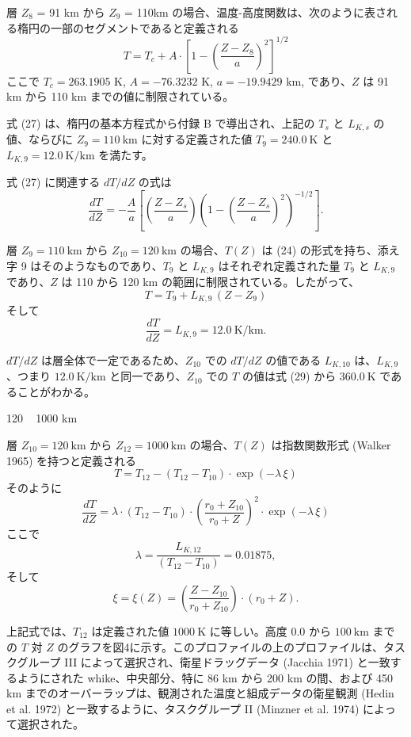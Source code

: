 \documentclass{article}
\begin{document}
層 $Z_8$ = 91 km から $Z_9$ = 110km の場合、温度-高度関数は、次のように表される楕円の一部のセグメントであると定義される
\begin{equation}
  T = T_c + A \cdot \left[ 1 - \left( \frac{Z - Z_8}{a} \right)^2 \right]^{1/2}
  \tag{27}
\end{equation}
ここで
$T_c = 263.1905$ K, $A = -76.3232$ K, $a = -19.9429$ km, であり、$Z$ は 91 km から 110 km までの値に制限されている。

式 (27) は、楕円の基本方程式から付録 B で導出され、上記の $T_s$ と $L_{K,s}$ の値、ならびに $Z_9 = 110~\text{km}$ に対する定義された値 $T_9 = 240.0~\text{K}$ と $L_{K,9} = 12.0~\text{K/km}$ を満たす。

式 (27) に関連する $dT/dZ$ の式は
\[
\frac{dT}{dZ} = -\frac{A}{a} \left[ \left(\frac{Z - Z_s}{a} \right) \left(1 - \left(\frac{Z - Z_s}{a} \right)^2 \right)^{-1/2} \right]. \tag{28}
\]

層 $Z_9 = 110~\text{km}$ から $Z_{10} = 120~\text{km}$ の場合、$T(Z)$ は (24) の形式を持ち、添え字 9 はそのようなものであり、$T_9$ と $L_{K,9}$ はそれぞれ定義された量 $T_9$ と $L_{K,9}$ であり、$Z$ は 110 から 120 km の範囲に制限されている。したがって、
\[
T = T_9 + L_{K,9} \, (Z - Z_9) \tag{29}
\]
そして
\[
\frac{dT}{dZ} = L_{K,9} = 12.0~\text{K/km}. \tag{30}
\]

$dT/dZ$ は層全体で一定であるため、$Z_{10}$ での $dT/dZ$ の値である $L_{K,10}$ は、$L_{K,9}$、つまり $12.0~\text{K/km}$ と同一であり、$Z_{10}$ での $T$ の値は式 (29) から $360.0~\text{K}$ であることがわかる。

120 ~ 1000 km

層 $Z_{10} = 120~\text{km}$ から $Z_{12} = 1000~\text{km}$ の場合、$T(Z)$ は指数関数形式 (Walker 1965) を持つと定義される
\[
T = T_{12} - (T_{12} - T_{10}) \cdot \exp(-\lambda \, \xi) \tag{31}
\]
そのように
\[
\frac{dT}{dZ} = \lambda \cdot (T_{12} - T_{10}) \cdot \left(\frac{r_0 + Z_{10}}{r_0 + Z}\right)^2 \cdot \exp(-\lambda \, \xi) \tag{32}
\]
ここで
\[
\lambda = \frac{L_{K,12}}{(T_{12} - T_{10})} = 0.01875,
\]
そして
\[
\xi = \xi(Z) = \left(\frac{Z - Z_{10}}{r_0 + Z_{10}}\right) \cdot (r_0 + Z).
\]

上記式では、$T_{12}$ は定義された値 $1000~\text{K}$ に等しい。高度 $0.0$ から $100~\text{km}$ までの $T$ 対 $Z$ のグラフを図4に示す。このプロファイルの上のプロファイルは、タスクグループ III によって選択され、衛星ドラッグデータ (Jacchia 1971) と一致するようにされた whike、中央部分、特に 86 km から 200 km の間、および 450 km までのオーバーラップは、観測された温度と組成データの衛星観測 (Hedin et al. 1972) と一致するように、タスクグループ II (Minzner et al. 1974) によって選択された。
\end{document}
